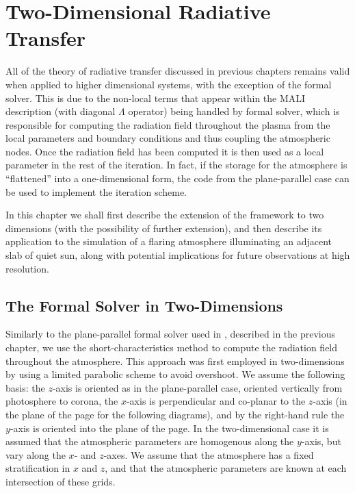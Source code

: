 \chapter{Two-Dimensional Radiative Transfer}


All of the theory of radiative transfer discussed in previous chapters remains valid when applied to higher dimensional systems, with the exception of the formal solver.
This is due to the non-local terms that appear within the MALI description (with diagonal $\Lambda$ operator) being handled by formal solver, which is responsible for computing the radiation field throughout the plasma from the local parameters and boundary conditions and thus coupling the atmospheric nodes.
Once the radiation field has been computed it is then used as a local parameter in the rest of the iteration.
In fact, if the storage for the atmosphere is ``flattened'' into a one-dimensional form, the code from the plane-parallel case can be used to implement the iteration scheme.

In this chapter we shall first describe the extension of the \Lw{} framework to two dimensions (with the possibility of further extension), and then describe its application to the simulation of a flaring atmosphere illuminating an adjacent slab of quiet sun, along with potential implications for future observations at high resolution.

\section{The Formal Solver in Two-Dimensions}

Similarly to the plane-parallel formal solver used in \Lw{}, described in the previous chapter, we use the short-characteristics method to compute the radiation field throughout the atmosphere.
This approach was first employed in two-dimensions by \citet{Auer1994} using a limited parabolic scheme to avoid overshoot.
We assume the following basis: the $z$-axis is oriented as in the plane-parallel case, oriented vertically from photosphere to corona, the $x$-axis is perpendicular and co-planar to the $z$-axis (in the plane of the page for the following diagrams), and by the right-hand rule the $y$-axis is oriented into the plane of the page.
In the two-dimensional case it is assumed that the atmospheric parameters are homogenous along the $y$-axis, but vary along the $x$- and $z$-axes.
We assume that the atmosphere has a fixed stratification in $x$ and $z$, and that the atmospheric parameters are known at each intersection of these grids.

